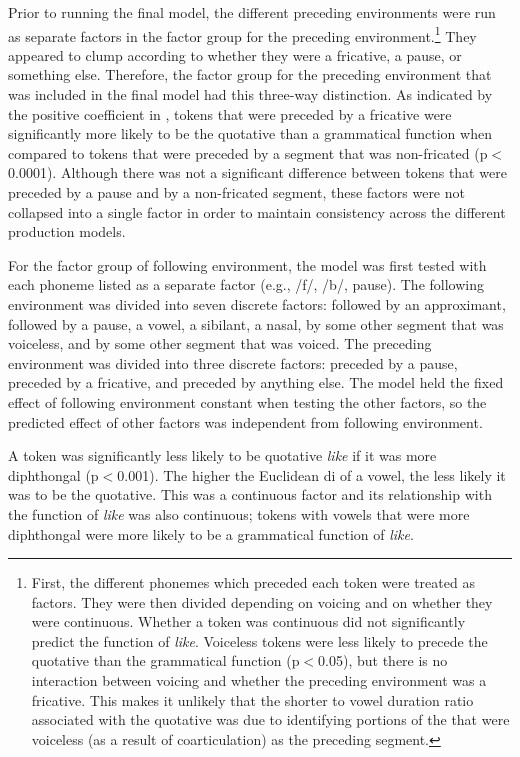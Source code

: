 Prior to running the final model, the different preceding environments were run as separate factors in the factor group for the preceding environment.\footnote{First, the different phonemes which preceded each token were treated as factors. They were then divided depending on voicing and on whether they were continuous. Whether a token was continuous did not significantly predict the function of \textit{like}. Voiceless tokens were less likely to precede the quotative than the grammatical function (p$<$0.05), but there is no interaction between voicing and whether the preceding environment was a fricative. This makes it unlikely that the shorter  to vowel duration ratio associated with the quotative was due to identifying portions of the  that were voiceless (as a result of coarticulation) as the preceding segment.} They appeared to clump according to whether they were a fricative, a pause, or something else. Therefore, the factor group for the preceding environment that was included in the final model had this three-way distinction. As indicated by the positive coefficient in , tokens that were preceded by a fricative were significantly more likely to be the quotative than a grammatical function when compared to tokens that were preceded by a segment that was non-fricated (p$<$0.0001). Although there was not a significant difference between tokens that were preceded by a pause and by a non-fricated segment, these factors were not collapsed into a single factor in order to maintain consistency across the different production models.

For the factor group of following environment, the model was first tested with each phoneme listed as a separate factor (e.g., /f/, /b/, pause). The following environment was divided into seven discrete factors: followed by an approximant, followed by a pause, a vowel, a sibilant, a nasal, by some other segment that was voiceless, and by some other segment that was voiced. The preceding environment was divided into three discrete factors: preceded by a pause, preceded by a fricative, and preceded by anything else. The model held the fixed effect of following environment constant when testing the other factors, so the predicted effect of other factors was independent from following environment. 

A token was significantly less likely to be quotative \textit{like} if it was more diphthongal (p$<$0.001). The higher the Euclidean di of a vowel, the less likely it was to be the quotative. This was a continuous factor and its relationship with the function of \textit{like} was also continuous; tokens with vowels that were more diphthongal were more likely to be a grammatical function of \textit{like}.  


